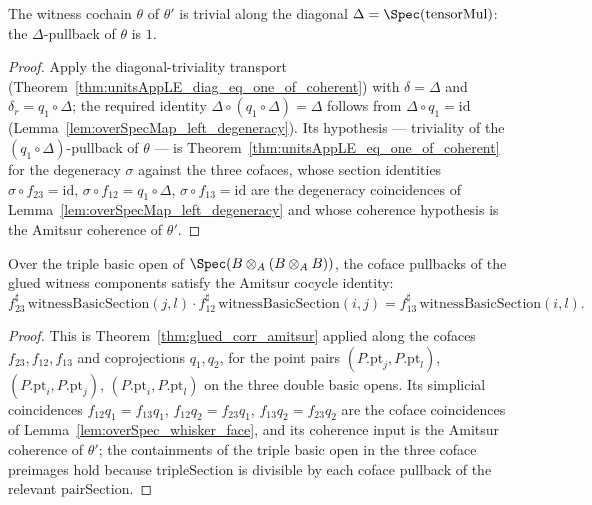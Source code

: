 \begin{theorem}
  \label{thm:witnessAppLE_diag_eq_one}
  \leanok
  The witness cochain \(\theta\) of \(\theta'\) is trivial along the diagonal \(\Delta =
  \Spec(\mathrm{tensorMul})\): the \(\Delta\)-pullback of \(\theta\) is \(1\).
\end{theorem}
\begin{proof}
  \leanok
  Apply the diagonal-triviality transport (Theorem~\ref{thm:unitsAppLE_diag_eq_one_of_coherent})
  with \(\delta = \Delta\) and \(\delta_r = q_1 \circ \Delta\); the required identity
  \(\Delta \circ (q_1 \circ \Delta) = \Delta\) follows from \(\Delta \circ q_1 = \mathrm{id}\)
  (Lemma~\ref{lem:overSpecMap_left_degeneracy}). Its hypothesis — triviality of the
  \((q_1 \circ \Delta)\)-pullback of \(\theta\) — is
  Theorem~\ref{thm:unitsAppLE_eq_one_of_coherent} for the degeneracy \(\sigma\) against the
  three cofaces, whose section identities \(\sigma \circ f_{23} = \mathrm{id}\),
  \(\sigma \circ f_{12} = q_1 \circ \Delta\), \(\sigma \circ f_{13} = \mathrm{id}\) are the
  degeneracy coincidences of Lemma~\ref{lem:overSpecMap_left_degeneracy} and whose coherence
  hypothesis is the Amitsur coherence of \(\theta'\).
\end{proof}

\begin{theorem}
  \label{thm:witnessBasicSection_amitsur}
  \leanok
  Over the triple basic open of \(\Spec(B \otimes_A (B \otimes_A B))\), the coface pullbacks of
  the glued witness components satisfy the Amitsur cocycle identity:
  \[
    f_{23}^{\sharp}\,\mathrm{witnessBasicSection}(j, l) \cdot
      f_{12}^{\sharp}\,\mathrm{witnessBasicSection}(i, j)
      = f_{13}^{\sharp}\,\mathrm{witnessBasicSection}(i, l) .
  \]
\end{theorem}
\begin{proof}
  \leanok
  This is Theorem~\ref{thm:glued_corr_amitsur} applied along the cofaces \(f_{23}, f_{12},
  f_{13}\) and coprojections \(q_1, q_2\), for the point pairs
  \((P.\mathrm{pt}_j, P.\mathrm{pt}_l)\), \((P.\mathrm{pt}_i, P.\mathrm{pt}_j)\),
  \((P.\mathrm{pt}_i, P.\mathrm{pt}_l)\) on the three double basic opens. Its simplicial
  coincidences \(f_{12} q_1 = f_{13} q_1\), \(f_{12} q_2 = f_{23} q_1\), \(f_{13} q_2 = f_{23}
  q_2\) are the coface coincidences of Lemma~\ref{lem:overSpec_whisker_face}, and its coherence
  input is the Amitsur coherence of \(\theta'\); the containments of the triple basic open in
  the three coface preimages hold because \(\mathrm{tripleSection}\) is divisible by each coface
  pullback of the relevant \(\mathrm{pairSection}\).
\end{proof}

